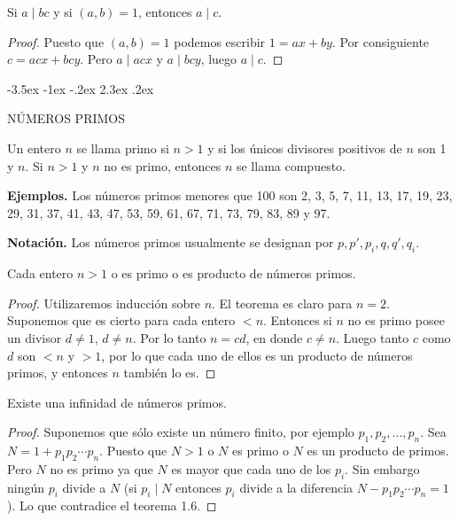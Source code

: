 \documentclass[12pt,a4paper]{book}
\makeatletter
\renewcommand\section{\@startsection{section}{1}{\z@}%
  {-3.5ex \@plus -1ex \@minus -.2ex}%
  {2.3ex \@plus .2ex}%
  {\normalfont\Large\bfseries\raggedright}}
\makeatother
\begin{document}
    \begin{teorema}
        Si $a\mid bc$ y si $(a,b)=1$, entonces $a\mid c$.
    \end{teorema}

    \begin{proof}
        Puesto que $(a,b)=1$ podemos escribir $1=ax+by$. Por consiguiente $c=acx+bcy$. Pero
        $a\mid acx$ y $a\mid bcy$, luego $a\mid c$.
    \end{proof}

    \section{NÚMEROS PRIMOS}

    \begin{definicion}
        Un entero $n$ se llama primo si $n>1$ y si los únicos divisores positivos de $n$ son
        1 y $n$. Si $n>1$ y $n$ no es primo, entonces $n$ se llama compuesto.
    \end{definicion}

    \textbf{Ejemplos.} Los números primos menores que 100 son 2, 3, 5, 7, 11, 13, 17, 19, 23,
    29, 31, 37, 41, 43, 47, 53, 59, 61, 67, 71, 73, 79, 83, 89 y 97.

    \textbf{Notación.} Los números primos usualmente se designan por $p,p',p_{i},q,q',q_{i}$.

    \begin{teorema}
        Cada entero $n>1$ o es primo o es producto de números primos.
    \end{teorema}

    \begin{proof}
        Utilizaremos inducción sobre $n$. El teorema es claro para $n=2$. Suponemos que es
        cierto para cada entero $<n$. Entonces si $n$ no es primo posee un divisor $d\neq1$,
        $d\neq n$. Por lo tanto $n=cd$, en donde $c\neq n$. Luego tanto $c$ como $d$ son $<n$
        y $>1$, por lo que cada uno de ellos es un producto de números primos, y entonces $n$
        también lo es.
    \end{proof}

    \begin{teorema}[Euclides]
        Existe una infinidad de números primos.
    \end{teorema}

    \begin{proof}
        Suponemos que sólo existe un número finito, por ejemplo $p_{1},p_{2},\dots,p_{n}$. Sea
        $N=1+p_{1}p_{2}\cdots p_{n}$. Puesto que $N>1$ o $N$ es primo o $N$ es un producto de
        primos. Pero $N$ no es primo ya que $N$ es mayor que cada uno de los $p_{i}$. Sin
        embargo ningún $p_{i}$ divide a $N$ (si $p_{i}\mid N$ entonces $p_{i}$ divide a la
        diferencia $N-p_{1}p_{2}\cdots p_{n}=1$). Lo que contradice el teorema 1.6.
    \end{proof}
\end{document}
